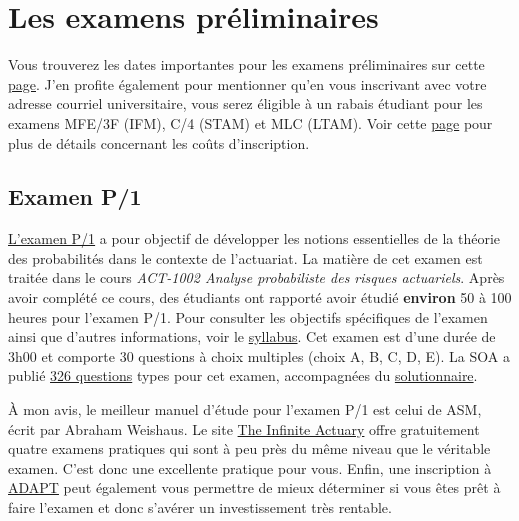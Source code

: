 \section*{Les examens préliminaires}
\label{sec:prelims}
Vous trouverez les dates importantes pour les examens préliminaires sur cette \href{https://www.soa.org/Education/Exam-Req/Exam-Day-Info/edu-2018-cbt-test-schedule.aspx}{page}. J'en profite également pour mentionner qu'en vous inscrivant avec votre adresse courriel universitaire, vous serez éligible à un rabais étudiant pour les examens MFE/3F (IFM), C/4 (STAM) et MLC (LTAM). Voir cette \href{https://soa.org/Education/Exam-Req/Syllabus-Study-Materials/Exam-and-Module-Fees.aspx}{page} pour plus de détails concernant les coûts d'inscription.


\subsection*{Examen P/1}
\label{subsec:examp}
\href{https://www.soa.org/education/exam-req/edu-exam-p-detail.aspx}{L'examen P/1} a pour objectif de développer les notions essentielles de la théorie des probabilités dans le contexte de l'actuariat. La matière de cet examen est traitée dans le cours \textit{ACT-1002 Analyse probabiliste des risques actuariels}. Après avoir complété ce cours, des étudiants ont rapporté avoir étudié \textbf{environ} 50 à 100 heures pour l'examen P/1. Pour consulter les objectifs spécifiques de l'examen ainsi que d'autres informations, voir le \href{https://www.soa.org/Files/Edu/2017/edu-2017-01-p-syllabus.pdf}{syllabus}. Cet examen est d'une durée de 3h00 et comporte 30 questions à choix multiples (choix A, B, C, D, E). La SOA a publié \href{http://www.soa.org/Files/Edu/edu-exam-p-sample-quest.pdf}{326 questions} types pour cet examen, accompagnées du \href{http://www.soa.org/Files/Edu/edu-exam-p-sample-sol.pdf}{solutionnaire}.\vspace{\baselineskip}

À mon avis, le meilleur manuel d'étude pour l'examen P/1 est celui de ASM, écrit par Abraham Weishaus. Le site \href{http://www.theinfiniteactuary.com/exams/1}{The Infinite Actuary} offre gratuitement quatre examens pratiques qui sont à peu près du même niveau que le véritable examen. C'est donc une excellente pratique pour vous. Enfin, une inscription à \href{https://www.coachingactuaries.com/}{ADAPT} peut également vous permettre de mieux déterminer si vous êtes prêt à faire l'examen et donc s'avérer un investissement très rentable.\vspace{\baselineskip}


